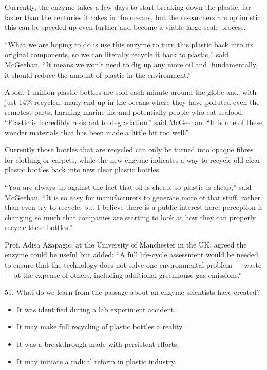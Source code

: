 \documentclass[UTF8,11pt]{ctexart}
\begin{document}
Currently, the enzyme takes a few days to start breaking down the plastic, far faster than the centuries it takes in the oceans, but the researchers are optimistic this can be speeded up even further and become a viable large-scale process.


“What we are hoping to do is use this enzyme to turn this plastic back into its original components, so we can literally recycle it back to plastic,” said McGeehan. “It means we won’t need to dig up any more oil and, fundamentally, it should reduce the amount of plastic in the environment.”


About 1 million plastic bottles are sold each minute around the globe and, with just 14\% recycled, many end up in the oceans where they have polluted even the remotest parts, harming marine life and potentially people who eat seafood. “Plastic is incredibly resistant to degradation.” said McGeehan. “It is one of these wonder materials that has been made a little bit too well.”


Currently those bottles that are recycled can only be turned into opaque fibres for clothing or carpets, while the new enzyme indicates a way to recycle old clear plastic bottles back into new clear plastic bottles.


“You are always up against the fact that oil is cheap, so plastic is cheap,” said McGeehan. “It is so easy for manufacturers to generate more of that stuff, rather than even try to recycle, but I believe there is a public interest here: perception is changing so much that companies are starting to look at how they can properly recycle these bottles.”


Prof. Adisa Azapagic, at the University of Manchester in the UK, agreed the enzyme could be useful but added: “A full life-cycle assessment would be needed to ensure that the technology does not solve one environmental problem — waste — at the expense of others, including additional greenhouse gas emissions.”


51. What do we learn from the passage about an enzyme scientists have created?


\begin{itemize}[leftmargin=2em,itemsep=.2em,topsep=.4em]\item[A.] It was identified during a lab experiment accident.
\item[B.] It may make full recycling of plastic bottles a reality.
\item[C.] It was a breakthrough made with persistent efforts.
\item[D.] It may initiate a radical reform in plastic industry.
\end{itemize}
\end{document}
